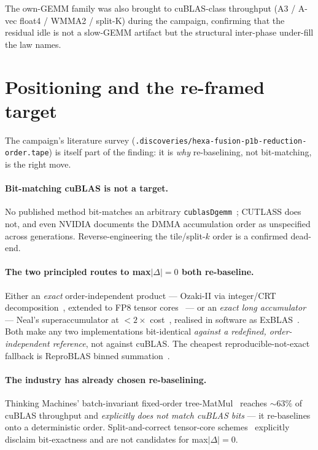\documentclass[11pt,a4paper]{article}
\begin{document}
\noindent The own-GEMM family was also brought to cuBLAS-class throughput
(A3 / A-vec float4 / WMMA2 / split-K) during the campaign, confirming that
the residual idle is not a slow-GEMM artifact but the structural
inter-phase under-fill the law names.

\section{Positioning and the re-framed target}
\label{sec:related}

The campaign's literature survey
(\texttt{.discoveries/hexa-fusion-p1b-reduction-order.tape}) is itself part
of the finding: it is \emph{why} re-baselining, not bit-matching, is the
right move.

\paragraph{Bit-matching cuBLAS is not a target.}
No published method bit-matches an arbitrary
\texttt{cublasDgemm}~\citep{nvidia2024cublas}; CUTLASS does not, and even
NVIDIA documents the DMMA accumulation order as unspecified across
generations. Reverse-engineering the tile/split-$k$ order is a confirmed
dead-end.

\paragraph{The two principled routes to max$|\Delta|=0$ both re-baseline.}
Either an \emph{exact} order-independent product --- Ozaki-II via integer/CRT
decomposition~\citep{ozaki2025exactgemm}, extended to FP8 tensor
cores~\citep{mukunoki2025fp8ozaki} --- or an \emph{exact long accumulator} ---
Neal's superaccumulator at $<2\times$ cost~\citep{neal2015superaccumulator},
realised in software as ExBLAS~\citep{iakymchuk2020exblas}. Both make any two
implementations bit-identical \emph{against a redefined, order-independent
reference}, not against cuBLAS. The cheapest reproducible-not-exact fallback
is ReproBLAS binned summation~\citep{demmel2018reproblas}.

\paragraph{The industry has already chosen re-baselining.}
Thinking Machines' batch-invariant fixed-order tree-MatMul~\citep{thinkingmachines2025batchinvariant}
reaches ${\sim}63\%$ of cuBLAS throughput and \emph{explicitly does not match
cuBLAS bits} --- it re-baselines onto a deterministic order. Split-and-correct
tensor-core schemes~\citep{ootomo2022splitcorrect} explicitly disclaim
bit-exactness and are not candidates for max$|\Delta|=0$.
\end{document}
